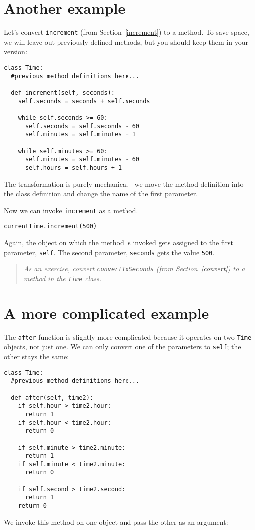 \section{Another example}

Let's convert {\tt increment} (from Section~\ref{increment}) to a
method.  To save space, we will leave out previously defined methods,
but you should keep them in your version:


\beforeverb
\begin{verbatim}
class Time:
  #previous method definitions here...

  def increment(self, seconds):
    self.seconds = seconds + self.seconds

    while self.seconds >= 60:
      self.seconds = self.seconds - 60
      self.minutes = self.minutes + 1

    while self.minutes >= 60:
      self.minutes = self.minutes - 60
      self.hours = self.hours + 1
\end{verbatim}
\afterverb
%
The transformation is purely mechanical---we move the method
definition into the class definition and change the name of the first
parameter.

Now we can invoke {\tt increment} as a method.

\beforeverb
\begin{verbatim}
currentTime.increment(500)
\end{verbatim}
\afterverb
%
Again, the object on which the method is invoked gets assigned
to the first parameter, {\tt self}.  The second parameter,
{\tt seconds} gets the value {\tt 500}.

\begin{quote}
{\em As an exercise, convert {\tt convertToSeconds} 
(from Section~\ref{convert}) to a method in the
{\tt Time} class.}
\end{quote}


\section{A more complicated example}

The {\tt after} function is slightly more complicated because it
operates on two {\tt Time} objects, not just one.  We can only convert
one of the parameters to {\tt self}; the other stays the same:

\beforeverb
\begin{verbatim}
class Time:
  #previous method definitions here...

  def after(self, time2):
    if self.hour > time2.hour:
      return 1
    if self.hour < time2.hour:
      return 0

    if self.minute > time2.minute:
      return 1
    if self.minute < time2.minute:
      return 0

    if self.second > time2.second:
      return 1
    return 0
\end{verbatim}
\afterverb
%
We invoke this method on one object and pass the other as an argument:

